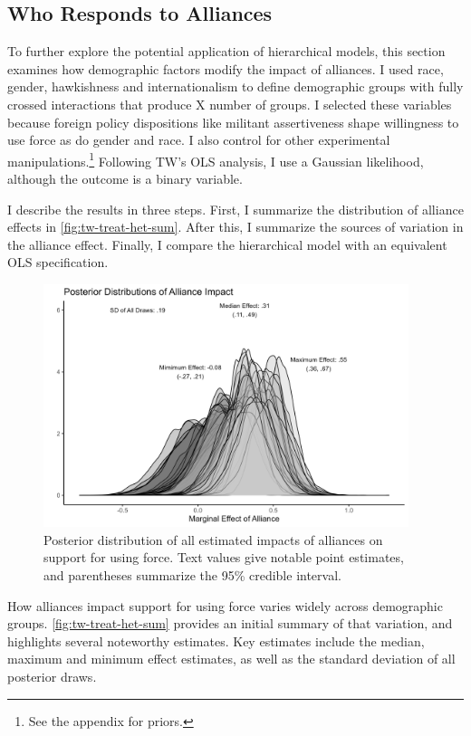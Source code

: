 \documentclass[12pt]{article}
\begin{document}
\subsection{Who Responds to Alliances}


To further explore the potential application of hierarchical models, this section examines how demographic factors modify the impact of alliances.
I used race, gender, hawkishness and internationalism to define demographic groups with fully crossed interactions that produce X number of groups.
I selected these variables because foreign policy dispositions like militant assertiveness shape willingness to use force \citep{Kertzeretal2014} as do gender \citep{Barnhartetal2020} and race. 
I also control for other experimental manipulations.\footnote{See the appendix for priors.} 
Following TW's OLS analysis, I use a Gaussian likelihood, although the outcome is a binary variable. 


I describe the results in three steps. 
First, I summarize the distribution of alliance effects in \autoref{fig:tw-treat-het-sum}. 
After this, I summarize the sources of variation in the alliance effect.
Finally, I compare the hierarchical model with an equivalent OLS specification.

\begin{figure}[htpb]
	\centering
		\includegraphics[width=0.95\textwidth]{../figures/tw-treat-het-sum.png}
	\caption{Posterior distribution of all estimated impacts of alliances on support for using force. Text values give notable point estimates, and parentheses summarize the 95\% credible interval.}
	\label{fig:tw-treat-het-sum}
\end{figure}


How alliances impact support for using force varies widely across demographic groups.
\autoref{fig:tw-treat-het-sum} provides an initial summary of that variation, and highlights several noteworthy estimates. 
Key estimates include the median, maximum and minimum effect estimates, as well as the standard deviation of all posterior draws.
\end{document}
